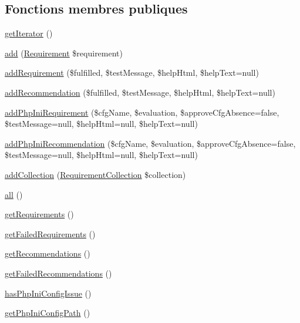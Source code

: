 \subsection*{Fonctions membres publiques}
\begin{DoxyCompactItemize}
\item 
\hyperlink{classRequirementCollection_a9b1922282e30ea8d9e267e206f63e071}{get\+Iterator} ()
\item 
\hyperlink{classRequirementCollection_a16be85daada80688601baf1d4048d4c6}{add} (\hyperlink{classRequirement}{Requirement} \$requirement)
\item 
\hyperlink{classRequirementCollection_a275b139b8f1daecf52952e67cb5bc6cf}{add\+Requirement} (\$fulfilled, \$test\+Message, \$help\+Html, \$help\+Text=null)
\item 
\hyperlink{classRequirementCollection_aa0c7a2d729d6a1d32d363b9c02d00b40}{add\+Recommendation} (\$fulfilled, \$test\+Message, \$help\+Html, \$help\+Text=null)
\item 
\hyperlink{classRequirementCollection_a21190a79cf3a13a6a4c9c7133c919d8f}{add\+Php\+Ini\+Requirement} (\$cfg\+Name, \$evaluation, \$approve\+Cfg\+Absence=false, \$test\+Message=null, \$help\+Html=null, \$help\+Text=null)
\item 
\hyperlink{classRequirementCollection_afeba77fa6ca369631f8a602800e9e29d}{add\+Php\+Ini\+Recommendation} (\$cfg\+Name, \$evaluation, \$approve\+Cfg\+Absence=false, \$test\+Message=null, \$help\+Html=null, \$help\+Text=null)
\item 
\hyperlink{classRequirementCollection_a4de7d0d4e50130610d6d6d3cadc5c91c}{add\+Collection} (\hyperlink{classRequirementCollection}{Requirement\+Collection} \$collection)
\item 
\hyperlink{classRequirementCollection_a7b84e71c211825222e548a5cc296f99b}{all} ()
\item 
\hyperlink{classRequirementCollection_a86ec2f872cec0395bc1f0206c2de8c6d}{get\+Requirements} ()
\item 
\hyperlink{classRequirementCollection_acd45245ad3ababfaeb5f0565add5e7cc}{get\+Failed\+Requirements} ()
\item 
\hyperlink{classRequirementCollection_aa21bc7027e02a0366c52227fbd3acb35}{get\+Recommendations} ()
\item 
\hyperlink{classRequirementCollection_ae11e0e7a5fd890a48f29d35876684e14}{get\+Failed\+Recommendations} ()
\item 
\hyperlink{classRequirementCollection_ae2b1f4fc39d0139dbebe0783cc100029}{has\+Php\+Ini\+Config\+Issue} ()
\item 
\hyperlink{classRequirementCollection_a40f0ae0bf0d5e4d0abcece27c151527d}{get\+Php\+Ini\+Config\+Path} ()
\end{DoxyCompactItemize}


